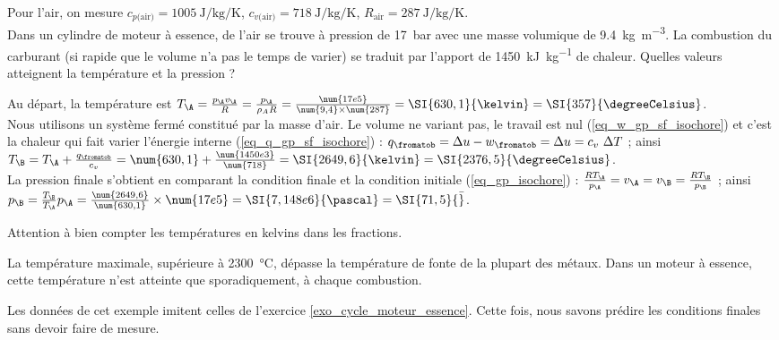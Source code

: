 		\begin{anexample}
			Pour l’air, on mesure $c_{p\text{(air)}} = \SI{1005}{\joule\per\kilogram\per\kelvin}$, $c_{v\text{(air)}} = \SI{718}{\joule\per\kilogram\per\kelvin}$, $R_\text{air} = \SI{287}{\joule\per\kilogram\per\kelvin}$.\\
			Dans un cylindre de moteur à essence, de l’air se trouve à pression de \SI{17}{\bar} avec une masse volumique de \SI{9,4}{\kilogram\per\metre\cubed}. La combustion du carburant (si rapide que le volume n’a pas le temps de varier) se traduit par l’apport de \SI{1450}{\kilo\joule\per\kilogram} de chaleur. Quelles valeurs atteignent la température et la pression ?
				\begin{answer}
					Au départ, la température est $T_\A = \frac{p_\A v_\A}{R} = \frac{p_\A}{\rho_A R} = \frac{\num{17e5}}{\num{9,4} \times \num{287}} = \SI{630,1}{\kelvin} = \SI{357}{\degreeCelsius}$.\\
					Nous utilisons un système fermé constitué par la masse d’air. Le volume ne variant pas, le travail est nul (\ref{eq_w_gp_sf_isochore}) et c’est la chaleur qui fait varier l’énergie interne (\ref{eq_q_gp_sf_isochore}) : $q_\fromatob = \Delta u - w_\fromatob = \Delta u = c_v \ \Delta T$ ; ainsi $T_\B = T_\A + \frac{q_\fromatob}{c_v} = \num{630,1} + \frac{\num{1450e3}}{\num{718}} = \SI{2649,6}{\kelvin} = \SI{2376,5}{\degreeCelsius}$.\\
					La pression finale s’obtient en comparant la condition finale et la condition initiale (\ref{eq_gp_isochore}) : $\frac{R T_\A}{p_\A} = v_\A = v_\B = \frac{R T_\B}{p_\B} $ ; ainsi $p_\B = \frac{T_\B}{T_\A} p_\A = \frac{\num{2649,6}}{\num{630,1}} \times \num{17e5} = \SI{7,148e6}{\pascal} = \SI{71,5}{\bar}$.
						\begin{remark}Attention à bien compter les températures en \si{kelvins} dans les fractions.\end{remark}
						\begin{remark}La température maximale, supérieure à \SI{2300}{\degreeCelsius}, dépasse la température de fonte de la plupart des métaux. Dans un moteur à essence, cette température n’est atteinte que sporadiquement, à chaque combustion.\end{remark}
						\begin{remark}Les données de cet exemple imitent celles de l’exercice \ref{exo_cycle_moteur_essence}. Cette fois, nous savons prédire les conditions finales sans devoir faire de mesure.\end{remark}
				\end{answer}
		\end{anexample}

